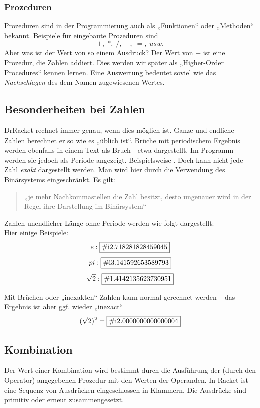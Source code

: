 \subsubsection{Prozeduren}
Prozeduren sind in der Programmierung auch als „Funktionen“ oder „Methoden“ bekannt. Beispiele für eingebaute Prozeduren sind
$$ +, \; *, \; /, \; -, \; =, \; usw.$$
Aber was ist der Wert von so einem Ausdruck? Der Wert von + ist eine Prozedur, die Zahlen addiert. Dies werden wir später als „Higher-Order Procedures“ kennen lernen. Eine Auswertung bedeutet soviel wie das \textit{Nachschlagen} des dem Namen zugewiesenen Wertes.

\subsection{Besonderheiten bei Zahlen}
DrRacket rechnet immer genau, wenn dies möglich ist. Ganze und endliche Zahlen berechnet er so wie es „üblich ist“. Brüche mit periodischem Ergebnis werden ebenfalls in einem Text als Bruch - etwa  dargestellt. Im Programm werden sie jedoch als Periode angezeigt. Beispielsweise . Doch kann nicht jede Zahl \textit{exakt} dargestellt werden. Man wird hier durch die Verwendung des Binärsystems eingeschränkt. Es gilt:
\begin{quote}
	„je mehr Nachkommastellen die Zahl besitzt, desto ungenauer wird in der Regel ihre Darstellung im Binärsystem“
\end{quote}

Zahlen unendlicher Länge ohne Periode werden wie folgt dargestellt: \\
Hier einige Beispiele:
$$e: \fbox{\#i2.718281828459045}$$
$$pi: \fbox{\#i3.141592653589793}$$
$$\sqrt{2}: \fbox{\#1.4142135623730951}$$

Mit Brüchen oder „inexakten“ Zahlen kann normal gerechnet
werden – das Ergebnis ist aber ggf. wieder „inexact“
$$(\sqrt{2})^2 = \fbox{\#i2.0000000000000004}$$

\subsection{Kombination}
Der Wert einer Kombination wird bestimmt durch die Ausführung der (durch den Operator) angegebenen Prozedur mit den Werten der Operanden. In Racket ist eine Sequenz von Ausdrücken eingeschlossen in Klammern. Die Ausdrücke sind primitiv oder erneut zusammengesetzt.

